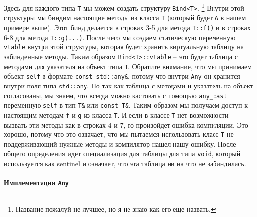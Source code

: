 Здесь для каждого типа \texttt{T} мы можем создать структуру \texttt{Bind<T>}.%
\footnote{Название пожалуй не лучшее, но я не знаю как его еще назвать.}
Внутри этой структуры мы биндим настоящие методы из класса \texttt{T} (который будет \texttt{A} в нашем примере выше).
Этот бинд делается в строках 3-5 для метода \texttt{T::f()} и в строках 6-8 для метода \texttt{T::g(...)}.
После чего мы создаем статическую переменную \texttt{vtable} внутри этой структуры, которая будет хранить виртуальную таблицу на забинденные методы.
Таким образом \texttt{Bind<T>::vtable} -- это будет таблица с методами для указателя на объект типа \texttt{T}.
Обратите внимание, что мы принимаем объект \texttt{self} в формате \texttt{const std::any\&}, потому что внутри \texttt{Any} он хранится внутри поля типа \texttt{std::any}.
Но так как таблица с методами и указатель на объект согласованы, мы знаем, что всегда можно кастовать с помощью \texttt{any\_cast} переменную \texttt{self} в тип \texttt{T\&} или \texttt{const T\&}.
Таким образом мы получаем доступ к настоящим методам \texttt{f} и \texttt{g} из класса \texttt{T}.
И если в классе \texttt{T} нет возможности вызвать эти методы как в строках 4 и 7, то произойдет ошибка компиляции.
Это хорошо, потому что это означает, что мы пытаемся использовать класс \texttt{T} не поддерживающий нужные методы и компилятор нашел нашу ошибку.
После общего определения идет специализация для таблицы для типа \texttt{void}, который используется как sentinel и означает, что эта таблица ни на что не забиндилась.

\paragraph{Имплементация \texttt{Any}}


